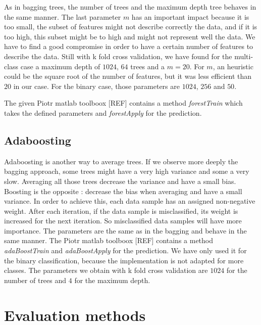 \documentclass{article} %
\begin{document}
As in bagging trees, the number of trees and the maximum depth tree behaves in the same manner. The last parameter $m$ has an important impact because it is too small, the subset of features might not describe correctly the data, and if it is too high, this subset might be to high and might not represent well the data. We have to find a good compromise in order to have a certain number of features to describe the data. Still with k fold cross validation, we have found for the multi-class case a maximum depth of $1024$,  $64$ trees and a $m = 20$. For $m$, an heuristic could be the square root of the number of features, but it was less efficient than $20$ in our case. For the binary case, those parameters are $1024$, $256$ and $50$.

The given Piotr matlab toolboox [REF] contains a method \textit{forestTrain} which takes the defined parameters and \textit{forestApply} for the prediction.

\subsection{Adaboosting}

Adaboosting is another way to average trees. If we observe more deeply the bagging approach, some trees might have a very high variance and some a very slow. Averaging all those trees decrease the variance and have a small bias. Boosting is the opposite : decrease the bias when averaging and have a small variance. In order to achieve this, each data sample has an assigned non-negative weight. After each iteration, if the data sample is misclassified, its weight is increased for the next iteration. So misclassified data samples will have more importance. The parameters are the same as in the bagging and behave in the same manner. The Piotr matlab toolboox [REF] contains a method \textit{adaBoostTrain} and \textit{adaBoostApply} for the prediction. We have only used it for the binary classification, because the implementation is not adapted for more classes. The parameters we obtain with k fold cross validation are $1024$ for the number of trees and $4$ for the maximum depth.

\section{Evaluation methods}
\end{document}
